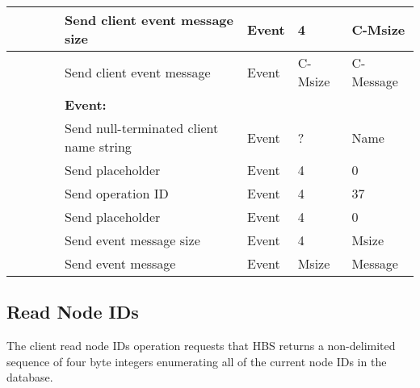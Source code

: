 \begin{tabular}{|p{1.2in}|p{.4in}|p{.4in}|p{.5in}|p{1.2in}|p{.4in}|p{.4in}|p{.5in} |}
                  &        &       &       & Send client event message
                                                  size    & Event  &   4   &  C-Msize \\ \hline
                  &        &       &       & Send client event message
                                                          & Event  & C-Msize & C-Message  \\ \hline
\multicolumn{4}{|l}{~}&\multicolumn{4}{|l|}{{\bf Event:}} \\ \hline
                  &        &       &       & Send null-terminated client
                                             name string  & Event  &  ?    & Name  \\ \hline
                  &        &       &       & Send placeholder  & Event  &   4   &   0    \\  \hline
                  &        &       &       & Send operation 
                                             ID           & Event  &   4   &  37   \\ \hline
                  &        &       &       & Send placeholder     & Event  &   4   &  0    \\ \hline
                  &        &       &       & Send event message
                                                  size    & Event  &   4   &  Msize \\ \hline
                  &        &       &       & Send event message
                                                          & Event  & Msize & Message  \\ \hline
\end{tabular}
\normalsize
\bigskip



\newpage
\subsection{Read Node IDs}

The client read node IDs operation requests that HBS returns a
non-delimited sequence of four byte integers enumerating all of the current
node IDs in the database.



